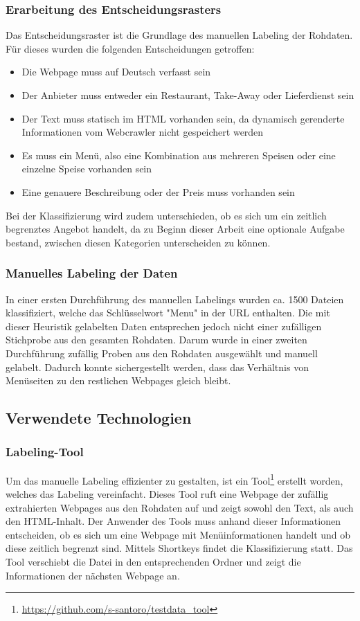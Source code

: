 \subsubsection{Erarbeitung des Entscheidungsrasters}
Das Entscheidungsraster ist die Grundlage des manuellen Labeling der Rohdaten.
Für dieses wurden die folgenden Entscheidungen getroffen:
\begin{itemize}
	\item Die Webpage muss auf Deutsch verfasst sein
	\item Der Anbieter muss entweder ein Restaurant, Take-Away oder Lieferdienst sein
	\item Der Text muss statisch im HTML vorhanden sein, da dynamisch gerenderte Informationen vom Webcrawler nicht gespeichert werden
	\item Es muss ein Menü, also eine Kombination aus mehreren Speisen oder eine einzelne Speise vorhanden sein
	\item Eine genauere Beschreibung oder der Preis muss vorhanden sein
\end{itemize}
Bei der Klassifizierung wird zudem unterschieden, ob es sich um ein zeitlich begrenztes Angebot handelt, da zu Beginn dieser Arbeit eine optionale Aufgabe bestand, zwischen diesen Kategorien unterscheiden zu können.
\subsubsection{Manuelles Labeling der Daten}
In einer ersten Durchführung des manuellen Labelings wurden ca. 1500 Dateien klassifiziert, welche das Schlüsselwort "Menu" in der URL enthalten.
Die mit dieser Heuristik gelabelten Daten entsprechen jedoch nicht einer zufälligen Stichprobe aus den gesamten Rohdaten.
Darum wurde in einer zweiten Durchführung zufällig Proben aus den Rohdaten ausgewählt und manuell gelabelt.
Dadurch konnte sichergestellt werden, dass das Verhältnis von Menüseiten zu den restlichen Webpages gleich bleibt.
\subsection{Verwendete Technologien}
\subsubsection{Labeling-Tool}
Um das manuelle Labeling effizienter zu gestalten, ist ein Tool\footnote{\url{https://github.com/s-santoro/testdata_tool}} erstellt worden, welches das Labeling vereinfacht.
Dieses Tool ruft eine Webpage der zufällig extrahierten Webpages aus den Rohdaten auf und zeigt sowohl den Text, als auch den HTML-Inhalt.
Der Anwender des Tools muss anhand dieser Informationen entscheiden, ob es sich um eine Webpage mit Menüinformationen handelt und ob diese zeitlich begrenzt sind.
Mittels Shortkeys findet die Klassifizierung statt.
Das Tool verschiebt die Datei in den entsprechenden Ordner und zeigt die Informationen der nächsten Webpage an.
